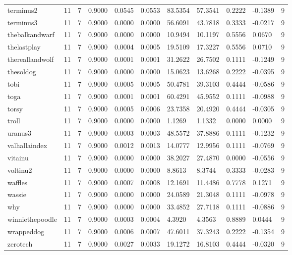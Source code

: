 \begin{table}[htbp]
\begin{tabular}{lllllllllll}
terminus2 & 11 & 7 & 0.9000 & 0.0545 & 0.0553 & 83.5354 & 57.3541 & 0.2222 & -0.1389 & 9 \\
terminus3 & 11 & 7 & 0.9000 & 0.0000 & 0.0000 & 56.6091 & 43.7818 & 0.3333 & -0.0217 & 9 \\
thebalkandwarf & 11 & 7 & 0.9000 & 0.0000 & 0.0000 & 10.9494 & 10.1197 & 0.5556 & 0.0670 & 9 \\
thelastplay & 11 & 7 & 0.9000 & 0.0004 & 0.0005 & 19.5109 & 17.3227 & 0.5556 & 0.0710 & 9 \\
thereallandwolf & 11 & 7 & 0.9000 & 0.0001 & 0.0001 & 31.2622 & 26.7502 & 0.1111 & -0.1249 & 9 \\
thesoldog & 11 & 7 & 0.9000 & 0.0000 & 0.0000 & 15.0623 & 13.6268 & 0.2222 & -0.0395 & 9 \\
tobi & 11 & 7 & 0.9000 & 0.0005 & 0.0005 & 50.4781 & 39.3103 & 0.4444 & -0.0586 & 9 \\
toga & 11 & 7 & 0.9000 & 0.0001 & 0.0001 & 60.4291 & 45.9552 & 0.1111 & -0.0988 & 9 \\
torsy & 11 & 7 & 0.9000 & 0.0005 & 0.0006 & 23.7358 & 20.4920 & 0.4444 & -0.0305 & 9 \\
troll & 11 & 7 & 0.9000 & 0.0000 & 0.0000 & 1.1269 & 1.1332 & 0.0000 & 0.0000 & 9 \\
uranus3 & 11 & 7 & 0.9000 & 0.0003 & 0.0003 & 48.5572 & 37.8886 & 0.1111 & -0.1232 & 9 \\
valhallaindex & 11 & 7 & 0.9000 & 0.0012 & 0.0013 & 14.0777 & 12.9956 & 0.1111 & -0.0769 & 9 \\
vitainu & 11 & 7 & 0.9000 & 0.0000 & 0.0000 & 38.2027 & 27.4870 & 0.0000 & -0.0556 & 9 \\
voltinu2 & 11 & 7 & 0.9000 & 0.0000 & 0.0000 & 8.8613 & 8.3744 & 0.3333 & -0.0283 & 9 \\
waffles & 11 & 7 & 0.9000 & 0.0007 & 0.0008 & 12.1691 & 11.4486 & 0.7778 & 0.1271 & 9 \\
wassie & 11 & 7 & 0.9000 & 0.0000 & 0.0000 & 24.0589 & 21.3048 & 0.1111 & -0.0978 & 9 \\
why & 11 & 7 & 0.9000 & 0.0000 & 0.0000 & 33.4852 & 27.7118 & 0.1111 & -0.0886 & 9 \\
winniethepoodle & 11 & 7 & 0.9000 & 0.0003 & 0.0004 & 4.3920 & 4.3563 & 0.8889 & 0.0444 & 9 \\
wrappeddog & 11 & 7 & 0.9000 & 0.0006 & 0.0007 & 47.6011 & 37.3243 & 0.2222 & -0.1354 & 9 \\
zerotech & 11 & 7 & 0.9000 & 0.0027 & 0.0033 & 19.1272 & 16.8103 & 0.4444 & -0.0320 & 9 \\

\end{tabular}
\end{table}
